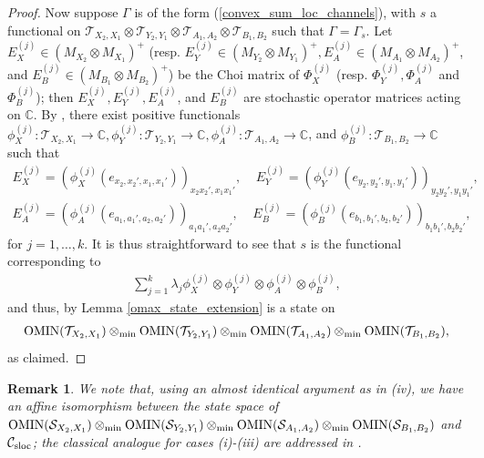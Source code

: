 \documentclass[11pt]{amsart}
\newtheorem{remark}[theorem]{Remark}
\newcommand{\cl}[1]{\mathcal{#1}}
\newcommand{\bb}[1]{\mathbb{#1}}
\begin{document}
\begin{proof}
Now suppose $\Gamma$ is of the form (\ref{convex_sum_loc_channels}), with $s$ a functional on $\cl{T}_{X_{2}, X_{1}}\otimes \cl{T}_{Y_{2}, Y_{1}}\otimes \cl{T}_{A_{1}, A_{2}}\otimes \cl{T}_{B_{1}, B_{2}}$ such that $\Gamma = \Gamma_{s}$. Let $E_{X}^{(j)} \in (M_{X_{2}}\otimes M_{X_{1}})^{+}$ (resp. $E_{Y}^{(j)} \in (M_{Y_{2}}\otimes M_{Y_{1}})^{+}, E_{A}^{(j)} \in (M_{A_{1}}\otimes M_{A_{2}})^{+}$, and $E_{B}^{(j)} \in (M_{B_{1}}\otimes M_{B_{2}})^{+}$) be the Choi matrix of $\Phi_{X}^{(j)}$ (resp. $\Phi_{Y}^{(j)}, \Phi_{A}^{(j)}$ and $\Phi_{B}^{(j)}$); then $E_{X}^{(j)}, E_{Y}^{(j)}, E_{A}^{(j)}$, and $E_{B}^{(j)}$ are stochastic operator matrices acting on $\bb{C}$. By \cite[Theorem 5.2]{tt}, there exist positive functionals $\phi_{X}^{(j)}: \cl{T}_{X_{2}, X_{1}}\rightarrow \bb{C}, \phi_{Y}^{(j)}: \cl{T}_{Y_{2}, Y_{1}}\rightarrow \bb{C}, \phi_{A}^{(j)}: \cl{T}_{A_{1}, A_{2}}\rightarrow \bb{C}$, and $\phi_{B}^{(j)}: \cl{T}_{B_{1}, B_{2}}\rightarrow \bb{C}$ such that
\begin{gather*}
	E_{X}^{(j)} = (\phi_{X}^{(j)}(e_{x_{2}, x_{2}', x_{1}, x_{1}'}))_{x_{2}x_{2}', x_{1}x_{1}'}, \;\;\;\; E_{Y}^{(j)} = (\phi_{Y}^{(j)}(e_{y_{2}, y_{2}', y_{1}, y_{1}'}))_{y_{2}y_{2}', y_{1}y_{1}'}, 
\\	E_{A}^{(j)} = (\phi_{A}^{(j)}(e_{a_{1}, a_{1}', a_{2}, a_{2}'}))_{a_{1}a_{1}', a_{2}a_{2}'}, \;\;\;\; E_{B}^{(j)} = (\phi_{B}^{(j)}(e_{b_{1}, b_{1}', b_{2}, b_{2}'}))_{b_{1}b_{1}', b_{2}b_{2}'},
\end{gather*}
\noindent for $j = 1, \hdots, k$. It is thus straightforward to see that $s$ is the functional corresponding to 
\begin{gather*}
	\sum\limits_{j=1}^{k}\lambda_{j}\phi_{X}^{(j)}\otimes \phi_{Y}^{(j)}\otimes \phi_{A}^{(j)}\otimes \phi_{B}^{(j)},
\end{gather*}
\noindent and thus, by Lemma \ref{omax_state_extension} is a state on 
\begin{gather*}
	{\rm OMIN}(\cl{T}_{X_{2}, X_{1}})\otimes_{\rm min} {\rm OMIN}(\cl{T}_{Y_{2}, Y_{1}})\otimes_{\rm min} {\rm OMIN}(\cl{T}_{A_{1}, A_{2}})\otimes_{\rm min} {\rm OMIN}(\cl{T}_{B_{1}, B_{2}}),
\end{gather*}
\noindent as claimed.
\end{proof}
\begin{remark}
\rm We note that, using an almost identical argument as in (iv), we have an affine isomorphism between the state space of ${\rm OMIN}(\cl{S}_{X_{2}, X_{1}})\otimes_{\rm min} {\rm OMIN}(\cl{S}_{Y_{2}, Y_{1}})\otimes_{\rm min} {\rm OMIN}(\cl{S}_{A_{1}, A_{2}})\otimes_{\rm min} {\rm OMIN}(\cl{S}_{B_{1}, B_{2}})$ and $\cl{C}_{\rm sloc}$; the classical analogue for cases (i)-(iii) are addressed in \cite[Theorem 7.11]{gt_one}.
\end{remark}
\end{document}
